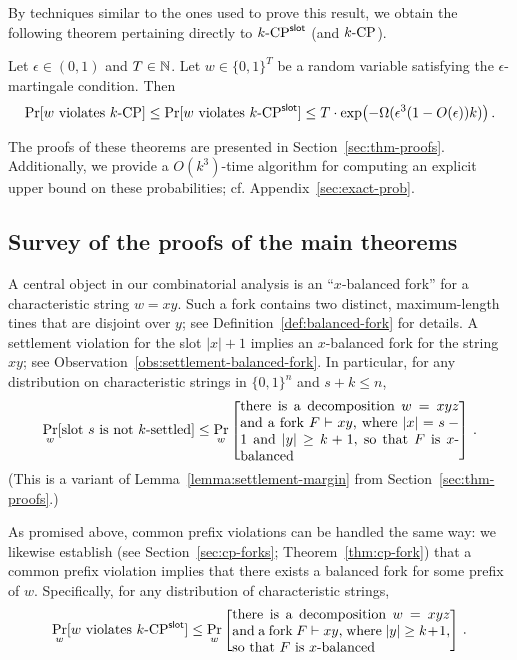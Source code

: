 By techniques similar to the ones used to prove this result, 
we obtain the following theorem pertaining
directly to ${k}\text{-}\mathrm{CP}^{\mathsf{slot}}$ (and ${k}\text{-}\mathrm{CP}$).
\begin{theorem} \label{thm:main-CP} Let
  $\epsilon \in (0,1)$ and $T \in \mathbb{N}$. Let $w \in \{0,1\}^T$ be a
  random variable satisfying the $\epsilon$-martingale condition.
  Then
  \[
    \Pr[\text{$w$ violates ${k}\text{-}\mathrm{CP}$}] 
      \leq \Pr[\text{$w$ violates ${k}\text{-}\mathrm{CP}^{\mathsf{slot}}$}] 
      \leq T \cdot \exp\bigl(-\Omega(\epsilon^3 (1 - O(\epsilon))k)\bigr)
      \,.
  \]
\end{theorem}
The proofs of these theorems are presented in Section~\ref{sec:thm-proofs}.
Additionally, we provide a $O(k^3)$-time algorithm for 
computing an explicit upper bound on these probabilities; cf. Appendix~\ref{sec:exact-prob}.


\subsection{Survey of the proofs of the main theorems}\label{sec:args-survey}
A central object in our combinatorial analysis is an ``$x$-balanced fork'' 
for a characteristic string $w = xy$. 
Such a fork contains two distinct, %
maximum-length tines 
that are disjoint over $y$; 
see Definition~\ref{def:balanced-fork} for details. 
A settlement violation for the slot $|x| + 1$ implies an $x$-balanced fork for the string $xy$; 
see Observation~\ref{obs:settlement-balanced-fork}. 
In particular, for any distribution on characteristic strings in $\{0,1\}^n$ and
$s + k \leq n$,
\[
  \Pr_{w}[\text{slot $s$ is not $k$-settled} ] 
    \leq
    \Pr_w\left[\parbox{55mm}{
      there is a decomposition $w = xyz$ and a fork $F \Fork xy$, 
      where $|x| = s - 1$ and $|y| \geq k + 1$, 
      so that $F$ is $x$-balanced
    }\right] 
    \,.
\]
(This is a variant of Lemma~\ref{lemma:settlement-margin} from Section~\ref{sec:thm-proofs}.)

As promised above, common prefix violations can be handled the same
way: we likewise establish (see Section~\ref{sec:cp-forks}; Theorem~\ref{thm:cp-fork}) that a common
prefix violation implies that there exists a balanced fork for some prefix of
$w$.  Specifically, for any distribution of characteristic strings, 
\begin{equation}\label{eq:pr-cp-fork}
  \Pr_w[\text{$w$ violates $\kSlotCP$}] 
    \leq 
    \Pr_{w}\left[\parbox{55mm}{
      there is a decomposition $w = xyz$ and a fork $F \Fork xy$, 
      where $|y| \geq k + 1$, 
      so that $F$ is $x$-balanced
    }\right] 
    \,. 
\end{equation}

